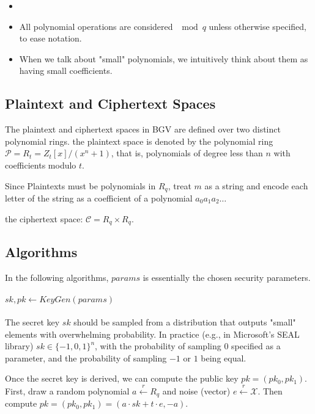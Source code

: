 \begin{remark}
    \begin{itemize}
        \item \red{check: I think we can treat coefficients as they were in $(0,q]$.}
        \item All polynomial operations are considered $\mod q$
         unless otherwise specified, to ease notation.
         \item When we talk about "small" polynomials, 
         we intuitively think about them as having small coefficients.
    \end{itemize}
\end{remark}

\subsection{Plaintext and Ciphertext Spaces}
The plaintext and ciphertext spaces in BGV are defined over two distinct
polynomial rings. the plaintext space is denoted by the polynomial
ring $\mathcal{P}=R_{t}= Z_{t}\left[x\right]/\left(x^{n}+1\right)$,
that is, polynomials of degree less than $n$ with coefficients modulo
$t$. 
\begin{remark}
    Since Plaintexts must be polynomials in $R_q$, treat 
    $m$ as a string and encode each letter of the string as a coefficient of a polynomial
    $a_{0}a_{1}a_{2}\dots$
\end{remark}


the ciphertext space: $\mathcal{C}=R_q \times R_q$. 

\subsection{Algorithms}
In the following algorithms, $params$ is essentially the chosen security parameters. 
\paragraph{$sk,pk \leftarrow KeyGen(params)$}
The secret key $sk$ should be sampled from a distribution that outputs "small" elements 
with overwhelming probability. In practice (e.g., in Microsoft's SEAL library) $sk\in\{-1,0,1\}^n$,
with the probability of sampling 0 specified as a parameter, and the probability of sampling $-1$ or $1$
being equal. 

Once the secret key is derived, we can compute the public key $pk=(pk_0,pk_1)$.
First, draw a random polynomial $a\overset{r}{\leftarrow} R_q$ and 
noise (vector) $e\overset{r}{\leftarrow} \mathcal{X}$. Then compute 
$pk=(pk_0,pk_1)=(a\cdot sk+t\cdot e, -a)$.

